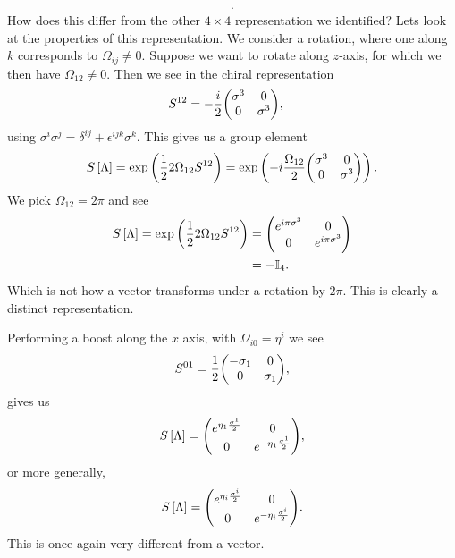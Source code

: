 \begin{examples}
\begin{enumerate}[label=\arabic*)]
\begin{align}
            .\end{align}
            How does this differ from the other $4 \times 4$ representation we identified? Lets look at the properties of this representation. We consider a rotation, where one along $k$ corresponds to $\Omega_{ij} \neq 0$. Suppose we want to rotate along $z$-axis, for which we then have $\Omega_{12} \neq 0$. Then we see in the chiral representation
            \begin{align}
                S^{12} &= -\frac{i}{2} \mqty( \sigma^{3} & 0 \\ 0 & \sigma^{3})
            ,\end{align}
            using $\sigma^{i} \sigma^{j} = \delta^{ij} + \epsilon^{ijk} \sigma^{k}$. This gives us a group element
            \begin{align}
                S \left[ \Lambda \right] = \exp \left( \frac{1}{2} 2 \Omega_{12} S^{12} \right)  = \exp \left( -i \frac{\Omega_{12}}{2} \mqty( \sigma^{3} & 0 \\ 0 & \sigma^{3}) \right) 
            .\end{align}
            We pick $\Omega_{12} = 2\pi$ and see
            \begin{align}
                S \left[ \Lambda \right] = \exp \left( \frac{1}{2} 2 \Omega_{12} S^{12} \right)  &= \mqty( e^{i\pi \sigma^3} & 0 \\ 0 & e^{i \pi \sigma^3} )\\
                &= - \mathbb{I}_{4} 
            .\end{align}
            Which is not how a vector transforms under a rotation by $2\pi$. This is clearly a distinct representation.

            Performing a boost along the $x$ axis, with $\Omega_{i 0} = \eta^{i}$ we see
            \begin{align}
                S^{01} = \frac{1}{2} \mqty( - \sigma_1 & 0 \\ 0 & \sigma_1)
            ,\end{align}
            gives us
            \begin{align}
                S\left[ \Lambda \right] = \mqty( e^{\eta_1 \frac{\sigma^{1}}{2}} & 0 \\ 0 & e^{-\eta_1 \frac{\sigma^{1}}{2}} )
            ,\end{align}
            or more generally,
            \begin{align}
                S\left[ \Lambda \right] = \mqty( e^{\eta_i \frac{\sigma^{i}}{2}} & 0 \\ 0 & e^{-\eta_i \frac{\sigma^{i}}{2}} )
            .\end{align}
            This is once again very different from a vector.
    \end{enumerate}
\end{examples}

